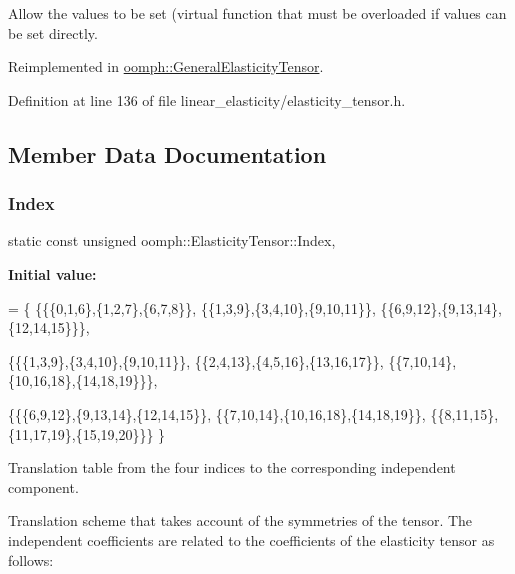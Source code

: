Allow the values to be set (virtual function that must be overloaded if values can be set directly. 



Reimplemented in \hyperlink{classoomph_1_1GeneralElasticityTensor_aa8dee57c5a1315f790401628ece5ec26}{oomph\+::\+General\+Elasticity\+Tensor}.



Definition at line 136 of file linear\+\_\+elasticity/elasticity\+\_\+tensor.\+h.



\subsection{Member Data Documentation}
\mbox{\label{classoomph_1_1ElasticityTensor_a6be831fdf71155ccbab14287d30587f1}} 
\subsubsection{\texorpdfstring{Index}{Index}}
{\footnotesize\ttfamily static const unsigned oomph\+::\+Elasticity\+Tensor\+::\+Index\hspace{0.3cm}{\ttfamily [static]}, {\ttfamily [protected]}}

{\bfseries Initial value\+:}
\begin{DoxyCode}
= 
 \{
  \{\{\{0,1,6\},\{1,2,7\},\{6,7,8\}\},
   \{\{1,3,9\},\{3,4,10\},\{9,10,11\}\},
   \{\{6,9,12\},\{9,13,14\},\{12,14,15\}\}\},
   
  \{\{\{1,3,9\},\{3,4,10\},\{9,10,11\}\},
   \{\{2,4,13\},\{4,5,16\},\{13,16,17\}\},
   \{\{7,10,14\},\{10,16,18\},\{14,18,19\}\}\},
  
  \{\{\{6,9,12\},\{9,13,14\},\{12,14,15\}\},
   \{\{7,10,14\},\{10,16,18\},\{14,18,19\}\},
   \{\{8,11,15\},\{11,17,19\},\{15,19,20\}\}\}
 \}
\end{DoxyCode}


Translation table from the four indices to the corresponding independent component. 

Translation scheme that takes account of the symmetries of the tensor. The independent coefficients are related to the coefficients of the elasticity tensor as follows\+:

